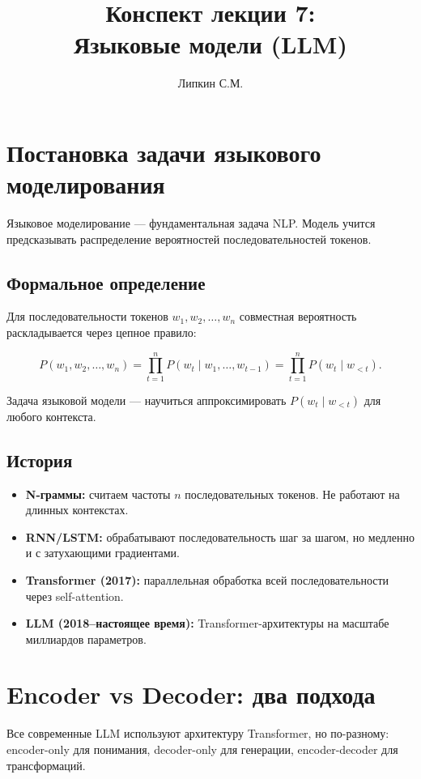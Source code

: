 \documentclass[a4paper,12pt]{article}
\title{Конспект лекции 7: \\ Языковые модели (LLM)}
\author{Липкин С.М.}
\date{}
\begin{document}
\maketitle

\section{Постановка задачи языкового моделирования}

Языковое моделирование --- фундаментальная задача NLP. Модель учится предсказывать распределение вероятностей последовательностей токенов.

\subsection{Формальное определение}

Для последовательности токенов $w_1, w_2, \dots, w_n$ совместная вероятность раскладывается через цепное правило:

\[
P(w_1, w_2, \dots, w_n) = \prod_{t=1}^n P(w_t \mid w_{1}, \dots, w_{t-1}) = \prod_{t=1}^n P(w_t \mid w_{<t}).
\]

Задача языковой модели --- научиться аппроксимировать $P(w_t \mid w_{<t})$ для любого контекста.

\subsection{История}

\begin{itemize}
    \item \textbf{N-граммы:} считаем частоты $n$ последовательных токенов. Не работают на длинных контекстах.
    \item \textbf{RNN/LSTM:} обрабатывают последовательность шаг за шагом, но медленно и с затухающими градиентами.
    \item \textbf{Transformer (2017):} параллельная обработка всей последовательности через self-attention.
    \item \textbf{LLM (2018--настоящее время):} Transformer-архитектуры на масштабе миллиардов параметров.
\end{itemize}

\section{Encoder vs Decoder: два подхода}

Все современные LLM используют архитектуру Transformer, но по-разному: encoder-only для понимания, decoder-only для генерации, encoder-decoder для трансформаций.
\end{document}
